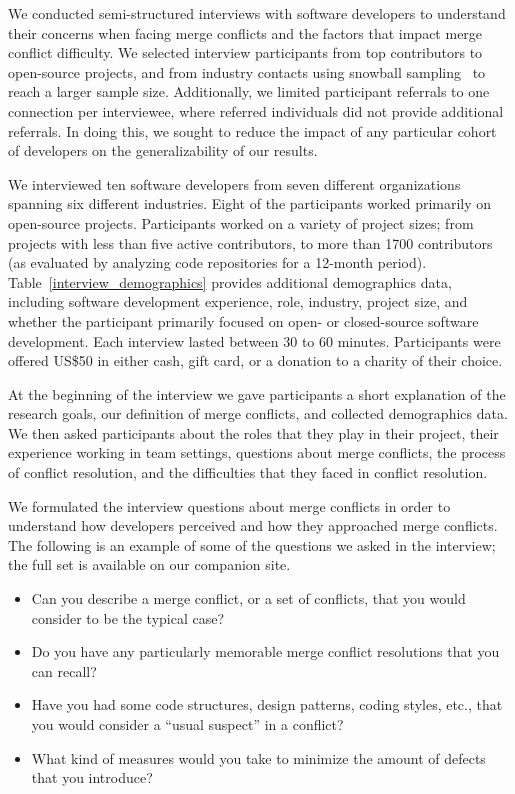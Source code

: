 We conducted semi-structured interviews with software developers to understand their concerns when facing merge conflicts and the factors that impact merge conflict difficulty.
We selected interview participants from top contributors to open-source projects, and from industry contacts using snowball sampling~\cite{goodman1961snowball} to reach a larger sample size. Additionally, we limited participant referrals to one connection per interviewee, where referred individuals did not provide additional referrals. In doing this, we sought to reduce the impact of any particular cohort of developers on the generalizability  of our results.

We interviewed ten software developers from seven different organizations spanning six different industries.
Eight of the participants worked primarily on open-source projects.
Participants worked on a variety of project sizes; from projects with less than five active contributors, to more than 1700 contributors (as evaluated by analyzing code repositories for a 12-month period).
Table~\ref{interview_demographics} provides additional demographics data, including software development experience, role, industry, project size, and whether the participant primarily focused on open- or closed-source software development.
Each interview lasted between 30 to 60 minutes.
Participants were offered US\$50 in either cash, gift card, or a donation to a charity of their choice.

At the beginning of the interview we gave participants a short explanation of the research goals, our definition of merge conflicts, and collected demographics data. 
We then asked participants about the roles that they play in their project, their experience working in team settings, questions about merge conflicts, the process of conflict resolution, and the difficulties that they faced in conflict resolution.

We formulated the interview questions about merge conflicts in order to understand how developers perceived and how they approached merge conflicts.
The following is an example of some of the questions we asked in the interview; the full set is available on our companion site.
\begin{itemize}
	\item Can you describe a merge conflict, or a set of conflicts, that you would consider to be the typical case?
	\item Do you have any particularly memorable merge conflict resolutions that you can recall?
	\item Have you had some code structures, design patterns, coding styles, etc., that you would consider a ``usual suspect'' in a conflict?
	\item What kind of measures would you take to minimize the amount of defects that you introduce?
\end{itemize}

